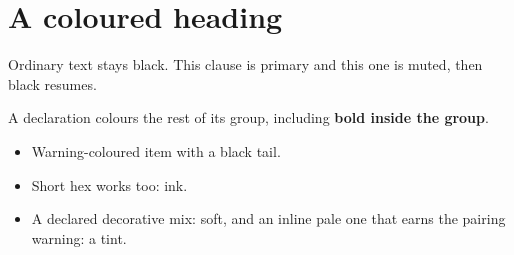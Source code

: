 \documentclass{article}
\begin{document}
\section{\textcolor{primary}{A coloured heading}}

Ordinary text stays black. \textcolor{primary}{This clause is primary} and
\textcolor{muted}{this one is muted}, then black resumes.

{\muted A declaration colours the rest of its group, including
\textbf{bold inside the group}.}

\begin{itemize}
  \item \textcolor{warn}{Warning-coloured item} with a black tail.
  \item Short hex works too: \textcolor{ink}{ink}.
  \item A declared decorative mix: \textcolor{soft}{soft}, and an inline
    pale one that earns the pairing warning: \textcolor{warn!40}{a tint}.
\end{itemize}
\end{document}
